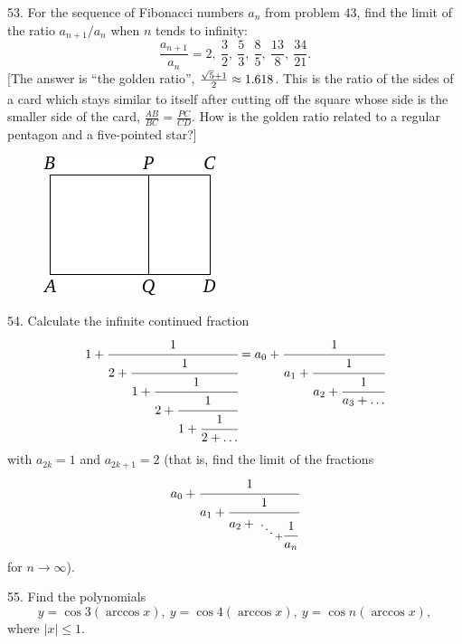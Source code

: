 \begin{problem}{53.}
	For the sequence of Fibonacci numbers $a_n$ from problem 43, find the limit of the ratio 
	$a_{n+1}/a_n$ when $n$ tends to infinity:\vspace{2\jot}
	\begin{equation*}
		\frac{a_{n+1}}{a_n}=2,\ \frac 32,\ \frac53, \ \frac85, \ \frac{13}8,
		\ \frac{34}{21}.
	\end{equation*}
	[The answer is \enquote{the golden ratio},
	$\frac{\sqrt{5}+1}{2\vphantom)} \approx 1.618$. This is the ratio of the sides of a card which stays
	similar to itself after cutting off the square whose side is the smaller side of the card,
	$\frac{AB}{BC}=\frac{PC}{CD}$. How is the golden ratio related to a regular pentagon and a five-pointed star?]
	\begin{figure}
		\includegraphics{taskbook-37}
	\end{figure}
\end{problem}

\begin{problem}{54.}
	Calculate the infinite continued fraction
	\begin{equation*}
		1+\cfrac{1}{2+\cfrac{1}{1+\cfrac{1}{2+\cfrac{1}{1+\cfrac{1}{2+\ldots}}}}}=
		a_0+\cfrac{1}{a_1+\cfrac{1}{a_2+\cfrac{1}{a_3+\dots}}}
	\end{equation*}
	with $a_{2k}=1$ and $a_{2k+1}=2$ (that is, find the limit of the fractions
	\begin{equation*}
		a_0+\cfrac{1}{a_1+\cfrac{1}{a_2+{\atop{\ddots \atop {}} + \cfrac{1}{a_n}}}}
	\end{equation*}
	for $n \to \infty$).
\end{problem}

\begin{problem}{55.}
	Find the polynomials 
	\begin{equation*}
		y=\cos 3 (\arccos x),\ y=\cos 4 (\arccos x),\ 
		y=\cos n (\arccos x),
	\end{equation*}
	where $|x| \leqslant 1$. 
\end{problem}

